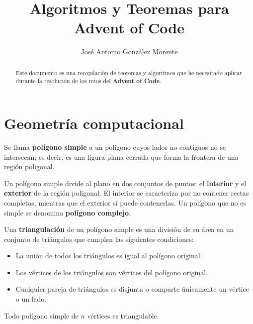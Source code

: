 \documentclass[a4paper,12pt]{article}
\title{\bfseries Algoritmos y Teoremas para Advent of Code}
\author{José Antonio González Morente}
\begin{document}
\maketitle

\begin{abstract}
    Este documento es una recopilación de teoremas y algoritmos que he necesitado aplicar durante la resolución de los retos del \textbf{Advent of Code}.
\end{abstract}

\tableofcontents

\section{Geometría computacional}
\begin{definition}
    Se llama \textbf{polígono simple} a un polígono cuyos lados no contiguos no se intersecan; es decir, es una figura plana cerrada que forma la frontera de una región poligonal.
\end{definition}

Un polígono simple divide al plano en dos conjuntos de puntos: el \textbf{interior} y el \textbf{exterior} de la región poligonal. El interior se caracteriza por no contener rectas completas, mientras que el exterior sí puede contenerlas. Un polígono que no es simple se denomina \textbf{polígono complejo}.

\begin{definition}
    Una \textbf{triangulación} de un polígono simple es una división de su área en un conjunto de triángulos que cumplen las siguientes condiciones:
    \begin{itemize}
        \item La unión de todos los triángulos es igual al polígono original.
        \item Los vértices de los triángulos son vértices del polígono original.
        \item Cualquier pareja de triángulos es disjunta o comparte únicamente un vértice o un lado.
    \end{itemize}
\end{definition}

\begin{lem}
    Todo polígono simple de $n$ vértices es triangulable.
\end{lem}
\end{document}
